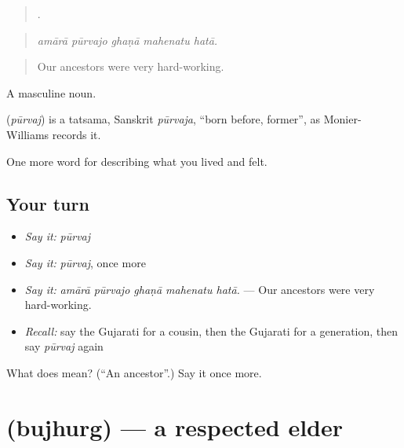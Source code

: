 \begin{quote}
    .
\end{quote}

\begin{quote}
\emph{amārā pūrvajo ghaṇā mahenatu hatā.}
\end{quote}

\begin{quote}
Our ancestors were very hard-working.
\end{quote}

A masculine noun.

\begin{cousinweb}
\textbf{} (\emph{pūrvaj}) is a tatsama, Sanskrit \emph{pūrvaja}, \textquotedblleft{}born before, former\textquotedblright{}, as Monier-Williams records it.
\end{cousinweb}

\begin{grammarlens}[title={What you've built}]
One more word for describing what you lived and felt.
\end{grammarlens}

\subsection*{Your turn}
\begin{itemize}
\raggedright
  \item \emph{Say it:} \emph{pūrvaj}
  \item \emph{Say it:} \emph{pūrvaj}, once more
  \item \emph{Say it:} \emph{amārā pūrvajo ghaṇā mahenatu hatā.} — Our ancestors were very hard-working.
  \item \emph{Recall:} say the Gujarati for a cousin, then the Gujarati for a generation, then say \emph{pūrvaj} again
\end{itemize}

\begin{tcolorbox}[breakable,colback=teal!4,colframe=teal!35!black,title={Before you move on}]
What does  mean? (\textquotedblleft{}An ancestor\textquotedblright{}.) Say it once more.
\end{tcolorbox}
\section[\texorpdfstring{\gu{બુઝુર્ગ} (bujhurg)}{બુઝુર્ગ (bujhurg)}]{ (bujhurg) — a respected elder}

